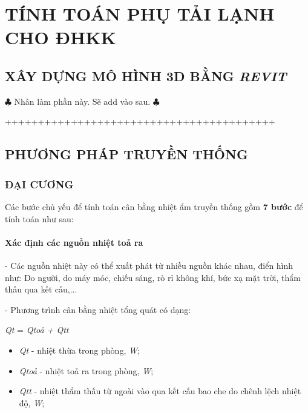\newpage
{}

\newpage
\chapter{\textbf{TÍNH TOÁN PHỤ TẢI LẠNH CHO ĐHKK}}
\newpage

\section{XÂY DỰNG MÔ HÌNH 3D BẰNG \emph{REVIT}}
$ \clubsuit $ Nhân làm phần này. Sẽ add vào sau. $ \clubsuit $

+++++++++++++++++++++++++++++++++++++++++

\section{PHƯƠNG PHÁP TRUYỀN THỐNG}
\subsection{ĐẠI CƯƠNG}
Các bước chủ yếu để tính toán cân bằng nhiệt ẩm truyền thống gồm \textbf{7 bước} để tính toán như sau:
\subsubsection{Xác định các nguồn nhiệt toả ra}
- Các nguồn nhiệt này có thể xuất phát từ nhiều nguồn khác nhau, điển hình như: Do người, do máy móc, chiếu sáng, rò rỉ không khí, bức xạ mặt trời, thẩm thấu qua kết cấu,...

- Phương trình cân bằng nhiệt tổng quát có dạng:

\begin{center}
	\textit{Q{\footnotesize t}} = \textit{Q{\footnotesize toả} + Q{\footnotesize tt}}
\end{center}

\begin{itemize}[leftmargin = 3cm, label = $\star$]
	\item \textit{Q{\footnotesize t}} - nhiệt thừa trong phòng, \textit{W};
	
	\item \textit{Q{\footnotesize toả}} - nhiệt toả ra trong phòng, \textit{W};
	
	\item \textit{Q{\footnotesize tt}} - nhiệt thẩm thấu từ ngoài vào qua kết cấu bao che do chênh lệch nhiệt độ, \textit{W};
\end{itemize}


